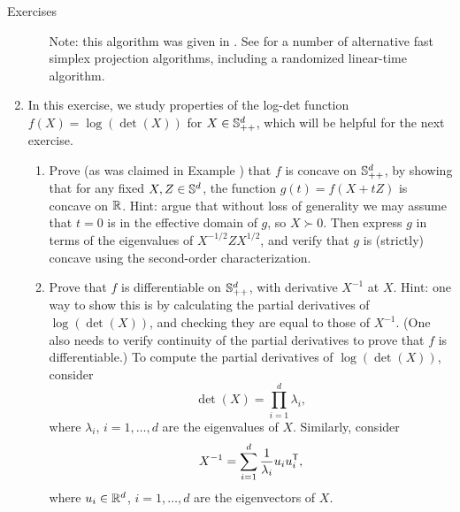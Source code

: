 \begin{xcb}{Exercises}
\begin{enumerate}[label=\thechapter.\arabic*]
\begin{enumerate}[label=\alph*.]
  \smallskip
  Note: this algorithm was given in \cite{held1974validation}. See
  \cite{condat2016fast} for a number of alternative fast simplex projection
  algorithms, including a randomized linear-time algorithm.  
\end{enumerate}

\item In this exercise, we study properties of the log-det function $f(X) =
  \log(\det(X))$ for $X \in \mathbb{S}_{++}^d$, which will be helpful for the next
  exercise.   

\begin{enumerate}[label=\alph*.]
\item Prove (as was claimed in Example ) that $f$ is
  concave on $\mathbb{S}_{++}^d$, by showing that for any fixed $X,Z \in \mathbb{S}^d$, the  
  function $g(t) = f(X + tZ)$ is concave on $\mathbb{R}$. Hint: argue that without loss
  of generality we may assume that $t = 0$ is in the effective domain of $g$, so
  $X \succ 0$. Then express $g$ in terms of the eigenvalues of $X^{-1/2} Z
  X^{1/2}$, and verify that $g$ is (strictly) concave using the second-order
  characterization.  

\item Prove that $f$ is differentiable on $\mathbb{S}_{++}^d$, with derivative $X^{-1}$
  at $X$. Hint: one way to show this is by calculating the partial derivatives
  of $\log(\det(X))$, and checking they are equal to those of $X^{-1}$. (One 
  also needs to verify continuity of the partial derivatives to prove that $f$
  is differentiable.) To compute the partial derivatives of $\log(\det(X))$,
  consider 
  \[
  \det(X) = \prod_{i=1}^d \lambda_i,
  \]
  where $\lambda_i$, $i=1,\dots,d$ are the eigenvalues of $X$. Similarly,
  consider 
  \[
  X^{-1} = \sum_{i=1}^d \frac{1}{\lambda_i} u_i u_i^{\mathsf{T}},
  \]
  where $u_i \in \mathbb{R}^d$, $i=1,\dots,d$ are the eigenvectors of $X$. 
\end{enumerate}


\end{enumerate}
\end{xcb}
